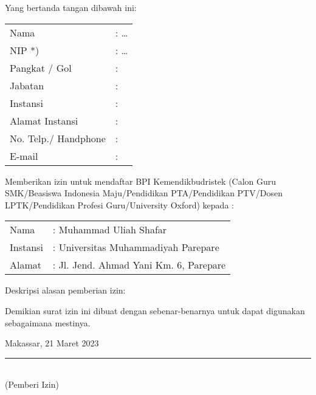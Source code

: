 \documentclass[12pt,a4paper]{lor}
\begin{document}
Yang bertanda tangan dibawah ini:

\begin{spacing}{1.56}

    \begin{tabular}{p{}@{}l@{}}
    Nama  & : \ldots \\
    NIP *)  & : \ldots  \\
    Pangkat / Gol & : \\
    Jabatan & : \\
    Instansi & : \\
    Alamat Instansi & : \\
    No. Telp./ Handphone & : \\
    E-mail & : \\
    \end{tabular}
\end{spacing}

Memberikan izin untuk mendaftar BPI Kemendikbudristek (Calon Guru SMK/Beasiswa Indonesia Maju/Pendidikan PTA/Pendidikan PTV/Dosen LPTK/Pendidikan Profesi Guru/University Oxford) kepada :

    \begin{tabular}{p{}@{}l@{}}
    Nama  & : Muhammad Uliah Shafar \\
    Instansi  & : Universitas Muhammadiyah Parepare  \\
    Alamat  & : Jl. Jend. Ahmad Yani Km. 6, Parepare   \\
    \end{tabular}

Deskripsi alasan pemberian izin:

Demikian surat izin ini dibuat dengan sebenar-benarnya untuk dapat digunakan sebagaimana mestinya.


\begin{flushright}

\begin{spacing}{1}
Makassar, 21 Maret 2023\\

\vspace{5em}
\rule{5cm}{1pt} \\%
(Pemberi Izin)
\end{spacing}
\end{flushright}
\end{document}
